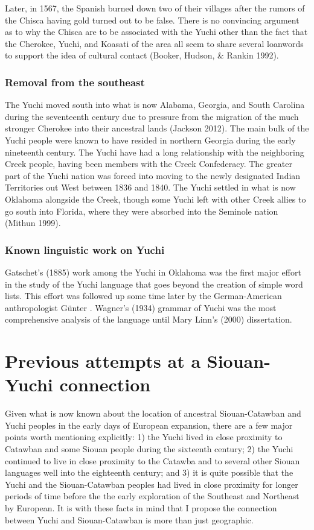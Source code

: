 \documentclass[output=paper]{LSP/langsci}
\begin{document}
Later, in 1567, the Spanish burned down two of their villages after the rumors of the Chisca having gold turned out to be false. There is no convincing argument as to why the Chisca are to be associated with the Yuchi other than the fact that the Cherokee, Yuchi, and Koasati of the area all seem to share several loanwords to support the idea of cultural contact (Booker, Hudson, \& Rankin 1992).

\subsubsection{Removal from the southeast} 

The Yuchi moved south into what is now Alabama, Georgia, and South Carolina during the seventeenth century due to pressure from the migration of the much stronger Cherokee into their ancestral lands (Jackson 2012). The main bulk of the Yuchi people were known to have resided in northern Georgia during the early nineteenth century. The Yuchi have had a long relationship with the neighboring Creek people, having been members with the Creek Confederacy. The greater part of the Yuchi nation was forced into moving to the newly designated Indian Territories out West between 1836 and 1840. The Yuchi settled in what is now Oklahoma alongside the Creek, though some Yuchi left with other Creek allies to go south into Florida, where they were absorbed into the Seminole nation (Mithun 1999).

\subsubsection{Known linguistic work on Yuchi} 

Gatschet's (1885) work among the Yuchi in Oklahoma was the first major effort in the study of the Yuchi language that goes beyond the creation of simple word lists. This effort was followed up some time later by the German-American anthropologist G\"unter \citet{Wagner1934}. Wagner's (1934) grammar of Yuchi was the most comprehensive analysis of the language until Mary Linn's (2000) dissertation.

\section{Previous attempts at a Siouan-Yuchi connection}

Given what is now known about the location of ancestral Siouan-Catawban and Yuchi peoples in the early days of European expansion, there are a few major points worth mentioning explicitly: 1) the Yuchi lived in close proximity to Catawban and some Siouan people during the sixteenth century; 2) the Yuchi continued to live in close proximity to the Catawba and to several other Siouan languages well into the eighteenth century; and 3) it is quite possible that the Yuchi and the Siouan-Catawban peoples had lived in close proximity for longer periods of time before the the early exploration of the Southeast and Northeast by European. It is with these facts in mind that I propose the connection between Yuchi and Siouan-Catawban is more than just geographic.
\end{document}
